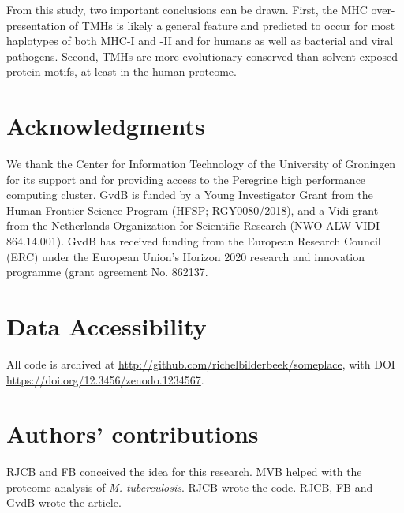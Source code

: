 From this study, two important conclusions can be drawn. 
First, the MHC over-presentation of TMHs is likely a general feature 
and predicted to occur for most haplotypes of both MHC-I and -II 
and for humans as well as bacterial and viral pathogens. 
Second, TMHs are more evolutionary conserved than solvent-exposed protein motifs, 
at least in the human proteome. 

\section{Acknowledgments}

We thank the Center for Information Technology of the University 
of Groningen for its support and for providing access to the Peregrine 
high performance computing cluster. GvdB is funded by a Young Investigator Grant from the Human Frontier Science Program (HFSP; RGY0080/2018), and a Vidi grant from the Netherlands Organization for Scientific Research (NWO-ALW VIDI 864.14.001). GvdB has received funding from the European Research Council (ERC) under the European Union’s Horizon 2020 research and innovation programme (grant agreement No. 862137. 

\section{Data Accessibility}

All code is archived at \url{http://github.com/richelbilderbeek/someplace},
with DOI \url{https://doi.org/12.3456/zenodo.1234567}.

\section{Authors' contributions}

RJCB and FB conceived the idea for this research. MVB helped with the proteome analysis of \emph{M. tuberculosis}.
RJCB wrote the code.
RJCB, FB and GvdB wrote the article.






